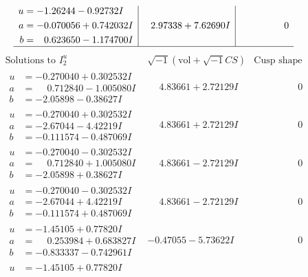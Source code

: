 \documentclass[1p]{elsarticle_modified}
\theoremstyle{definition}
\newcommand{\I}{\sqrt{-1}}
\begin{document}
$$\begin{array}{c|c|c}
\begin{aligned}
u &= -1.26244 - 0.92732 I \\
a &= -0.070056 + 0.742032 I \\
b &= \phantom{-}0.623650 - 1.174700 I\end{aligned}
 & \phantom{-}2.97338 + 7.62690 I & \phantom{-0.000000 } 0\\
 \hline 
 \end{array}$$\newpage$$\begin{array}{c|c|c}  
\text{Solutions to }I^u_{2}& \I (\text{vol} + \sqrt{-1}CS) & \text{Cusp shape}\\
 \hline 
\begin{aligned}
u &= -0.270040 + 0.302532 I \\
a &= \phantom{-}0.712840 - 1.005080 I \\
b &= -2.05898 - 0.38627 I\end{aligned}
 & \phantom{-}4.83661 + 2.72129 I & \phantom{-0.000000 } 0 \\ \hline\begin{aligned}
u &= -0.270040 + 0.302532 I \\
a &= -2.67044 - 4.42219 I \\
b &= -0.111574 - 0.487069 I\end{aligned}
 & \phantom{-}4.83661 + 2.72129 I & \phantom{-0.000000 } 0 \\ \hline\begin{aligned}
u &= -0.270040 - 0.302532 I \\
a &= \phantom{-}0.712840 + 1.005080 I \\
b &= -2.05898 + 0.38627 I\end{aligned}
 & \phantom{-}4.83661 - 2.72129 I & \phantom{-0.000000 } 0 \\ \hline\begin{aligned}
u &= -0.270040 - 0.302532 I \\
a &= -2.67044 + 4.42219 I \\
b &= -0.111574 + 0.487069 I\end{aligned}
 & \phantom{-}4.83661 - 2.72129 I & \phantom{-0.000000 } 0 \\ \hline\begin{aligned}
u &= -1.45105 + 0.77820 I \\
a &= \phantom{-}0.253984 + 0.683827 I \\
b &= -0.833337 - 0.742961 I\end{aligned}
 & -0.47055 - 5.73622 I & \phantom{-0.000000 } 0 \\ \hline\begin{aligned}
u &= -1.45105 + 0.77820 I \\

\end{aligned}
\end{array}$$
\end{document}
